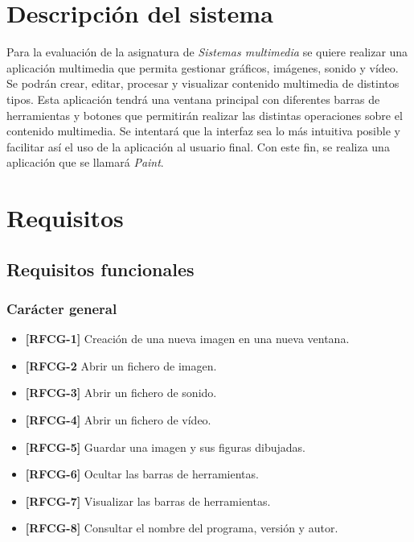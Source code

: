 \pagestyle{empty}
\maketitle
\vskip1cm
\clearpage
\tableofcontents
\clearpage
\setcounter{page}{1}
\pagestyle{plain}
\section{Descripción del sistema}
Para la evaluación de la asignatura de \textit{Sistemas multimedia} se quiere realizar una aplicación multimedia que permita gestionar gráficos, imágenes, sonido y vídeo. Se podrán crear, editar, procesar y visualizar contenido multimedia de distintos tipos.
\vskip0.3cm
Esta aplicación tendrá una ventana principal con diferentes barras de herramientas y botones que permitirán realizar las distintas operaciones sobre el contenido multimedia. Se intentará que la interfaz sea lo más intuitiva posible y facilitar así el uso de la aplicación al usuario final.
\vskip0.3cm
Con este fin, se realiza una aplicación que se llamará \textit{Paint}.
\section{Requisitos}
\subsection{Requisitos funcionales}
\subsubsection{Carácter general}
\begin{itemize}
\item{\textbf{[RFCG-1]} Creación de una nueva imagen en una nueva ventana.}
\item{\textbf{[RFCG-2} Abrir un fichero de imagen.}
\item{\textbf{[RFCG-3]} Abrir un fichero de sonido.}
\item{\textbf{[RFCG-4]} Abrir un fichero de vídeo.}
\item{\textbf{[RFCG-5]} Guardar una imagen y sus figuras dibujadas.}
\item{\textbf{[RFCG-6]} Ocultar las barras de herramientas.}
\item{\textbf{[RFCG-7]} Visualizar las barras de herramientas.}
\item{\textbf{[RFCG-8]} Consultar el nombre del programa, versión y autor.}
\end{itemize}
